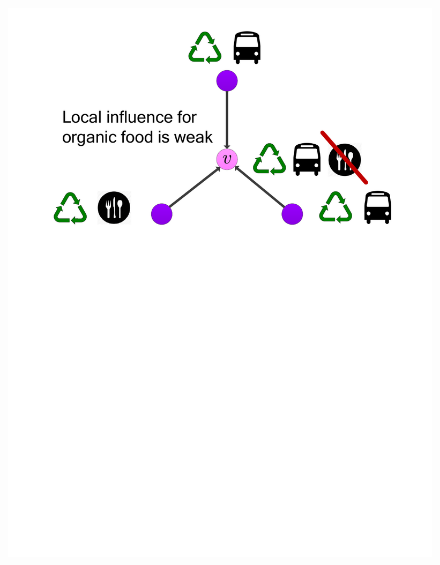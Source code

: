 \documentclass{article}
\begin{document}
\begin{figure}[htb]
{\includegraphics[viewport=1.75in 4in 7in 11in, width=\linewidth]{figs/timeline-3a}}%
\hspace{.2\linewidth}%
\parbox[][][t]{.3\linewidth}{%
}
\parbox{.3\linewidth}{
}
\end{figure}
\end{document}
